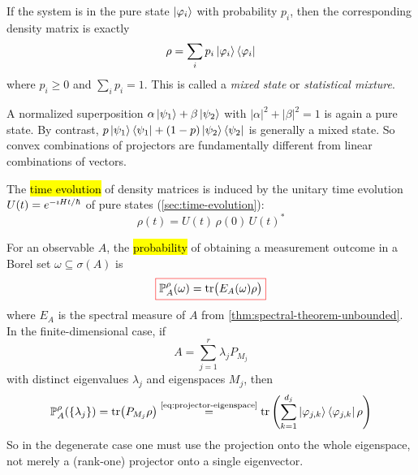 \begin{definition}\label{def:mixed-state}
If the system is in the pure state \(\ket{\varphi_i}\) with probability \(p_i\), then the corresponding density matrix is exactly
\begin{equation}\label{eq:mixed-state-density-matrix}
\rho
=
\sum_i p_i  \ket{\varphi_i}\bra{\varphi_i}
\end{equation}
where \(p_i \ge 0\) and \(\sum_i p_i = 1\).
This is called a \emph{mixed state} or \emph{statistical mixture}.
\end{definition}

\begin{caution}
A normalized superposition
\(
\alpha \ket{\psi_1} + \beta \ket{\psi_2}
\)
with \(|\alpha|^2 + |\beta|^2 = 1\) 
is again a pure state.
By contrast,
\(
p \ket{\psi_1}\bra{\psi_1} + (1-p)\ket{\psi_2}\bra{\psi_2}
\)
is generally a mixed state.
So convex combinations of projectors are fundamentally different from linear combinations of vectors.
\end{caution}

The \hl{time evolution} of density matrices is induced by the unitary time evolution
\(
U(t)=e^{-\imath H t/\hbar}
\) 
of pure states (\autoref{sec:time-evolution}):
\begin{equation}\label{eq:density-matrix-time-evolution}
\rho(t)
=
U(t)\,\rho(0)\,U(t)^*
\end{equation}

For an observable \(A\), the \hl{probability} of obtaining a measurement outcome in a Borel set \(\omega \subseteq \sigma(A)\) is
\begin{equation}\label{eq:born-rule}
{\color{red}\boxed{\color{black}
\operatorname{\mathbb{P}}_A^{\rho}(\omega)
=
\operatorname{tr}\bigl(E_A(\omega)\rho\bigr)
}}
\end{equation}
where \(E_A\) is the spectral measure of \(A\) from \autoref{thm:spectral-theorem-unbounded}.
In the finite-dimensional case, if
\[
A = \sum_{j=1}^r \lambda_j P_{M_j}
\]
with distinct eigenvalues \(\lambda_j\) and eigenspaces \(M_j\), then
\begin{equation}\label{eq:born-rule-density-matrix}
\operatorname{\mathbb{P}}_A^{\rho}(\{\lambda_j\})
=
\operatorname{tr}\bigl(P_{M_j}\rho\bigr)
\overset{\text{\eqref{eq:projector-eigenspace}}}{=}
\operatorname{tr}\left(\sum_{k=1}^{\smash[t]{d}_j} \ket{\varphi_{j,k}}\bra{\varphi_{j,k}} \rho\right)
\end{equation}
So in the degenerate case one must use the projection onto the whole eigenspace, not merely a (rank-one) projector onto a single eigenvector.



